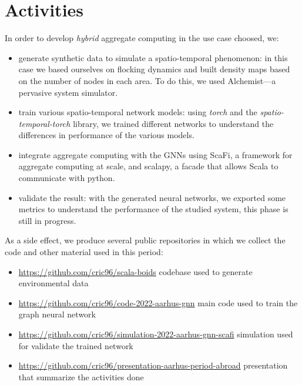 \documentclass{article}
\begin{document}
\section{Activities}
In order to develop \emph{hybrid} aggregate computing in the use case choosed, we:
\begin{itemize}
\item generate synthetic data to simulate a spatio-temporal phenomenon: in this case we based ourselves on flocking dynamics and built density maps based on the number of nodes in each area. To do this, we used Alchemist---a pervasive system simulator.
\item train various spatio-temporal network models: using \emph{torch} and the \emph{spatio-temporal-torch} library, we trained different networks to understand the differences in performance of the various models. 
\item integrate aggregate computing with the GNNs using ScaFi, a framework for aggregate computing at scale, and scalapy, a facade that allows Scala to communicate with python.
\item validate the result: with the generated neural networks, we exported some metrics to understand the performance of the studied system, this phase is still in progress.
\end{itemize}
As a side effect, we produce several public repositories in which we collect the code and other material used in this period:
\begin{itemize}
\item \url{https://github.com/cric96/scala-boids} codebase used to generate environmental data
\item \url{https://github.com/cric96/code-2022-aarhus-gnn} main code used to train the graph neural network
\item \url{https://github.com/cric96/simulation-2022-aarhus-gnn-scafi} simulation used for validate the trained network
\item \url{https://github.com/cric96/presentation-aarhus-period-abroad} presentation that summarize the activities done
\end{itemize}
\end{document}
